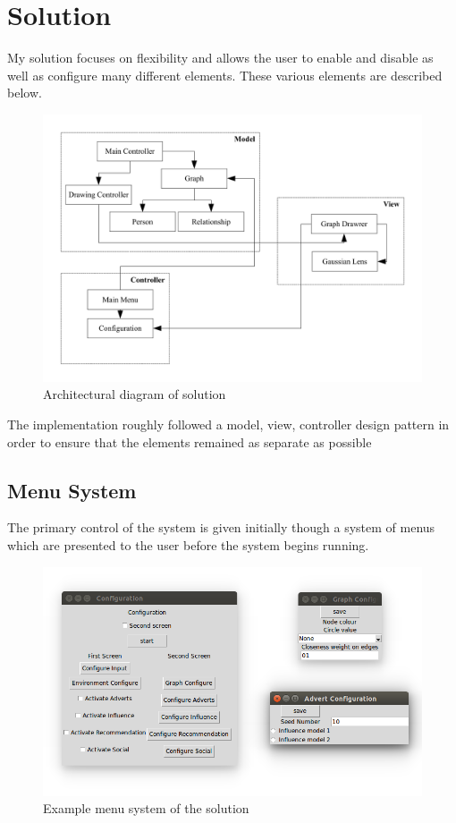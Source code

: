\documentclass[12pt,a4paper]{article}
\begin{document}
\section{Solution}

My solution focuses on flexibility and allows the user to enable and disable as well as configure many different elements. These various elements are described below.

\begin{figure}[htb]
\centering
\caption{Architectural diagram of solution}
\label{fig:diagram}
\includegraphics[scale=0.75]{ArchitectureDiagram.pdf}
\end{figure}

The implementation roughly followed a model, view, controller design pattern in order to ensure that the elements remained as separate as possible

\subsection{Menu System}

The primary control of the system is given initially though a system of menus which are presented to the user before the system begins running.

\begin{figure}[htb]
\centering
\caption{Example menu system of the solution}
\label{fig:menu}
\includegraphics[scale=0.5]{MenuShot.png}
\end{figure}
\end{document}
